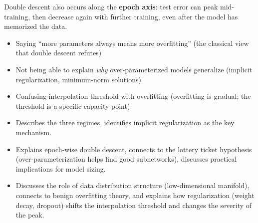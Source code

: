 \begin{interviewq}
Double descent also occurs along the \textbf{epoch axis}: test error can peak mid-training, then decrease again with further training, even after the model has memorized the data.

\redflags
\begin{itemize}
    \item Saying ``more parameters always means more overfitting'' (the classical view that double descent refutes)
    \item Not being able to explain \textit{why} over-parameterized models generalize (implicit regularization, minimum-norm solutions)
    \item Confusing interpolation threshold with overfitting (overfitting is gradual; the threshold is a specific capacity point)
\end{itemize}


\goodgreat
\begin{itemize}
    \item {} Describes the three regimes, identifies implicit regularization as the key mechanism.
    \item {} Explains epoch-wise double descent, connects to the lottery ticket hypothesis (over-parameterization helps find good subnetworks), discusses practical implications for model sizing.
    \item {} Discusses the role of data distribution structure (low-dimensional manifold), connects to benign overfitting theory, and explains how regularization (weight decay, dropout) shifts the interpolation threshold and changes the severity of the peak.
\end{itemize}

\end{interviewq}

\medskip


